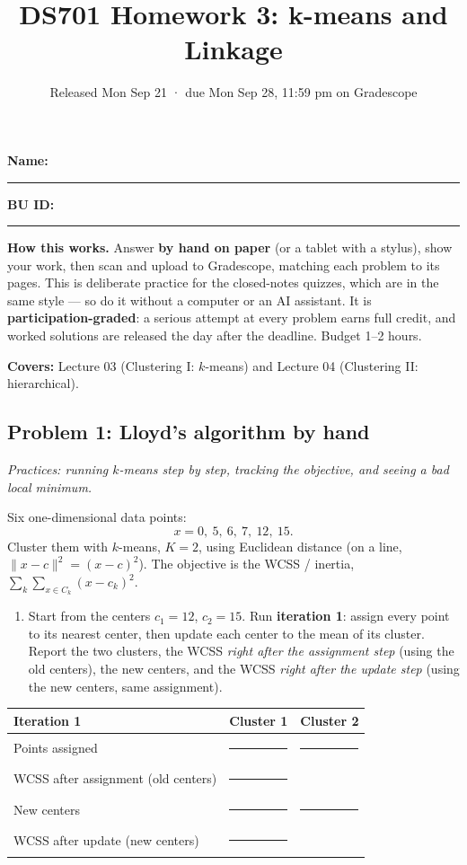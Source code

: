 \documentclass[
  11pt,
]{article}
\title{DS701 Homework 3: k-means and Linkage}
\subtitle{Released Mon Sep 21 · due Mon Sep 28, 11:59 pm on Gradescope}
\author{}
\date{}
\providecommand{\tightlist}{%
  \setlength{\itemsep}{0pt}\setlength{\parskip}{0pt}}
\newcommand{\blank}[1][1.2in]{\rule{#1}{0.4pt}}
\begin{document}
\maketitle


\noindent\textbf{Name:}\ \rule{2.0in}{0.4pt}\qquad\textbf{BU ID:}\ \rule{1.2in}{0.4pt}
\vspace{6pt}

\textbf{How this works.} Answer \textbf{by hand on paper} (or a tablet
with a stylus), show your work, then scan and upload to Gradescope,
matching each problem to its pages. This is deliberate practice for the
closed-notes quizzes, which are in the same style --- so do it without a
computer or an AI assistant. It is \textbf{participation-graded}: a
serious attempt at every problem earns full credit, and worked solutions
are released the day after the deadline. Budget 1--2 hours.

\textbf{Covers:} Lecture 03 (Clustering I: \(k\)-means) and Lecture 04
(Clustering II: hierarchical).

\subsection{Problem 1: Lloyd's algorithm by
hand}\label{problem-1-lloyds-algorithm-by-hand}

\emph{Practices: running \(k\)-means step by step, tracking the
objective, and seeing a bad local minimum.}

Six one-dimensional data points: \[x = 0,\ 5,\ 6,\ 7,\ 12,\ 15 .\]
Cluster them with \(k\)-means, \(K = 2\), using Euclidean distance (on a
line, \(\|x-c\|^2 = (x-c)^2\)). The objective is the WCSS / inertia,
\(\sum_k \sum_{x\in C_k}(x-c_k)^2\).

\begin{enumerate}
\def\labelenumi{(\alph{enumi})}
\tightlist
\item
  Start from the centers \(c_1 = 12\), \(c_2 = 15\). Run
  \textbf{iteration 1}: assign every point to its nearest center, then
  update each center to the mean of its cluster. Report the two
  clusters, the WCSS \emph{right after the assignment step} (using the
  old centers), the new centers, and the WCSS \emph{right after the
  update step} (using the new centers, same assignment).
\end{enumerate}

\begin{longtable}[]{@{}lll@{}}
\toprule\noalign{}
Iteration 1 & Cluster 1 & Cluster 2 \\
\midrule\noalign{}
\endhead
\bottomrule\noalign{}
\endlastfoot
Points assigned & \blank[1.6in] & \blank[1.6in] \\
WCSS after assignment (old centers) & \blank[1.6in] & \\
New centers & \blank[1.6in] & \blank[1.6in] \\
WCSS after update (new centers) & \blank[1.6in] & \\
\end{longtable}
\end{document}
